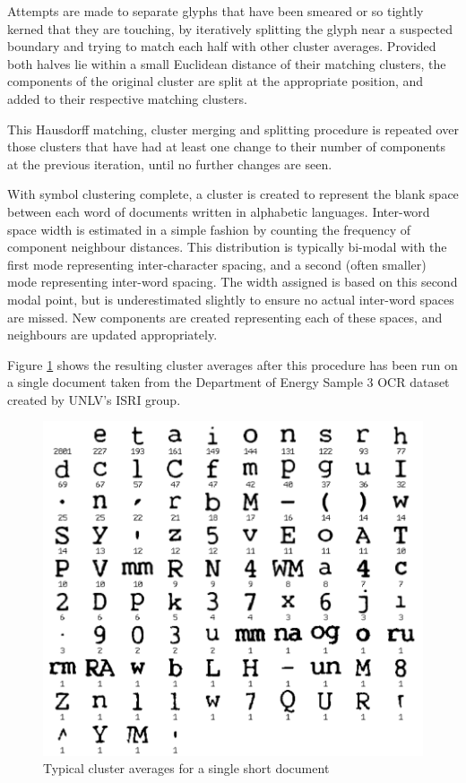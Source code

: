 \documentclass[times, 10pt,twocolumn]{article}
\begin{document}
Attempts are made to separate glyphs that have been smeared or so tightly
kerned that they are touching, by iteratively splitting the glyph near a
suspected boundary and trying to match each half with other cluster averages.
Provided both halves lie within a small Euclidean distance of their matching
clusters, the components of the original cluster are split at the appropriate
position, and added to their respective matching clusters.

This Hausdorff matching, cluster merging and splitting procedure is repeated
over those clusters that have had at least one change to their number of 
components at the previous iteration, until no further changes are seen.

With symbol clustering complete, a cluster is created to represent the blank
space between each word of documents written in alphabetic languages.
Inter-word space width is estimated in a simple fashion by counting the
frequency of component neighbour distances.  This distribution is typically
bi-modal with the first mode representing inter-character spacing, and a second
(often smaller) mode representing inter-word spacing.  The width assigned
is based on this second modal point, but is underestimated slightly to ensure no
actual inter-word spaces are missed.  New components are created representing
each of these spaces, and neighbours are updated appropriately.

Figure \ref{clavg_fig} shows the resulting cluster averages after this
procedure has been run on a single document taken from the Department of Energy
Sample 3 OCR dataset created by UNLV's ISRI group\cite{nartker2005}.

\begin{figure}[ht]
  \centering
  \includegraphics[scale=.5]{figures/cluster_averages}
  \caption{Typical cluster averages for a single short document}
  \label{clavg_fig}
\end{figure}
\end{document}
